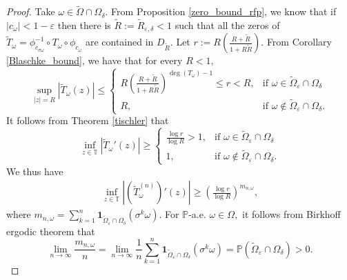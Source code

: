 \documentclass[12pt,reqno]{amsart}
\numberwithin{theorem}{section}
\begin{document}
\begin{proof}
     Take $\omega\in\tilde{\Omega}\cap\Omega_{\delta}.$  From Proposition \ref{zero_bound_rfp}, we know that if $|c_{\omega}|<1-\varepsilon$ then there is $\tilde{R}:=\tilde{R}_{\varepsilon, \delta}<1$ such that all the zeros of $\tilde{T}_{\omega}=\phi_{c_{\sigma\omega}}^{-1}\circ T_{\omega}\circ\phi_{c_{\omega}}$ are contained in $D_{\tilde{R}}.$ Let $r:=R\left(\frac{R+\tilde{R}}{1+R\tilde{R}}\right).$ From Corollary \ref{Blaschke_bound}, we have that for every $R<1,$ $$\sup_{|z|=R}|\tilde{T}_{\omega}(z)|\le\begin{cases}
        R\left(\frac{R+\tilde{R}}{1+R\tilde{R}}\right)^{\deg(T_{\omega})-1}\le r<R,&\text{if }\omega\in\tilde{\Omega}_{\varepsilon}\cap\Omega_{\delta}\\R,&\text{if }\omega\not\in\tilde{\Omega}_{\varepsilon}\cap\Omega_{\delta}.
    \end{cases}$$ It follows from Theorem \ref{tischler} that $$\inf_{z\in\mathbb{T}}|\tilde{T}_{\omega}'(z)|\ge\begin{cases}
        \frac{\log r}{\log R}>1, & \text{if }\omega\in \tilde{\Omega}_{\varepsilon}\cap\Omega_{\delta}\\1, & \text{if }\omega\not\in \tilde{\Omega}_{\varepsilon}\cap\Omega_{\delta}.
    \end{cases}$$ 
    We thus have \begin{align*}
        \inf_{z\in\mathbb{T}}|(\tilde{T}_{\omega}^{(n)})'(z)|\ge\left(\frac{\log r}{\log R}\right)^{m_{n,\omega}},
    \end{align*} where $m_{n,\omega}=\sum_{k=1}^{n}\textbf{1}_{\tilde{\Omega}_{\varepsilon}\cap\Omega_{\delta}}(\sigma^{k}\omega).$ For $\mathbb{P}$-a.e. $\omega\in\Omega,$ it follows from Birkhoff ergodic theorem that $$\lim_{n\to\infty}\frac{m_{n,\omega}}{n}=\lim_{n\to\infty}\frac{1}{n}\sum_{k=1}^{n}\textbf{1}_{\tilde{\Omega}_{\varepsilon}\cap\Omega_{\delta}}(\sigma^{k}\omega)=\mathbb{P}(\tilde{\Omega}_{\varepsilon}\cap\Omega_{\delta})>0.$$
    


\end{proof}
\end{document}
